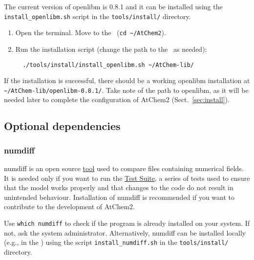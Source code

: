 The current version of openlibm is 0.8.1 and it can be installed using
the \texttt{install\_openlibm.sh} script in the \texttt{tools/install/}
directory.

\begin{enumerate}
\item Open the terminal. Move to the \maindir\ (\verb|cd ~/AtChem2|).
\item Run the installation script (change the path to the \depdir\ as
  needed):
  \begin{verbatim}
  ./tools/install/install_openlibm.sh ~/AtChem-lib/
  \end{verbatim}
\end{enumerate}

If the installation is successful, there should be a working openlibm
installation at \texttt{\textasciitilde/AtChem-lib/openlibm-0.8.1/}.
Take note of the path to openlibm, as it will be needed later to
complete the configuration of AtChem2 (Sect.~\ref{sec:install}).

\subsection{Optional dependencies} \label{subsec:optional-dependencies}

\subsubsection{numdiff}

numdiff is an open source \href{https://www.nongnu.org/numdiff/}{tool}
used to compare files containing numerical fields. It is needed only
if you want to run the \hyperref[sec:test-suite]{Test Suite}, a series
of tests used to ensure that the model works properly and that changes
to the code do not result in unintended behaviour. Installation of
numdiff is recommended if you want to contribute to the development of
AtChem2.

Use \verb|which numdiff| to check if the program is already installed
on your system. If not, ask the system administrator. Alternatively,
numdiff can be installed locally (e.g., in the \depdir) using the
script \texttt{install\_numdiff.sh} in the \texttt{tools/install/}
directory.

